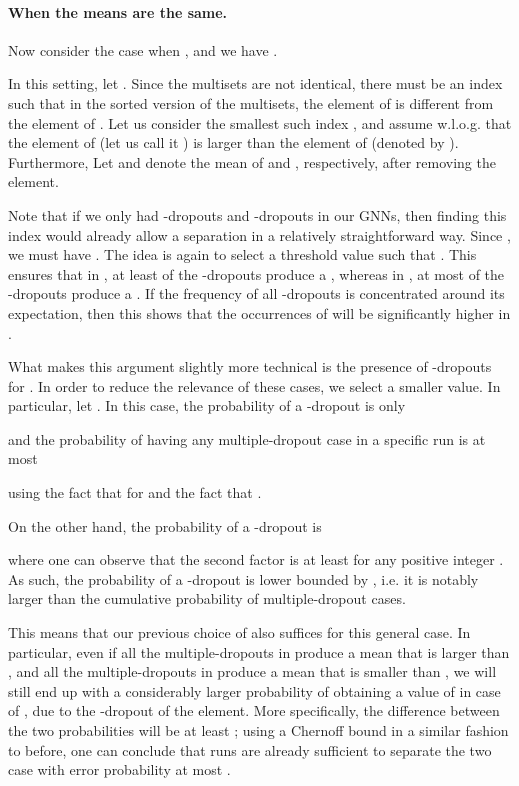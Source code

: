 \documentclass{article}
\begin{document}
\paragraph{When the means are the same.}

Now consider the case when , and we have .

In this setting, let . Since the multisets are not identical, there must be an index  such that in the sorted version of the multisets, the  element of  is different from the  element of . Let us consider the smallest such index , and assume w.l.o.g. that the  element of  (let us call it ) is larger than the  element of  (denoted by ). Furthermore, Let  and  denote the mean of  and , respectively, after removing the  element.

Note that if we only had -dropouts and -dropouts in our GNNs, then finding this index  would already allow a separation in a relatively straightforward way. Since , we must have . The idea is again to select a threshold value  such that . This ensures that in , at least  of the -dropouts produce a , whereas in , at most  of the -dropouts produce a . If the frequency of all -dropouts is concentrated around its expectation, then this shows that the occurrences of  will be significantly higher in .

What makes this argument slightly more technical is the presence of -dropouts for . In order to reduce the relevance of these cases, we select a smaller  value. In particular, let . In this case, the probability of a -dropout is only

and the probability of having any multiple-dropout case in a specific run is at most

using the fact that  for  and the fact that .

On the other hand, the probability of a -dropout is

where one can observe that the second factor is at least  for any positive integer . As such, the probability of a -dropout is lower bounded by , i.e. it is notably larger than the cumulative probability of multiple-dropout cases.

This means that our previous choice of  also suffices for this general case. In particular, even if all the multiple-dropouts in  produce a mean that is larger than , and all the multiple-dropouts in  produce a mean that is smaller than , we will still end up with a considerably larger probability of obtaining a value of  in case of , due to the -dropout of the  element. More specifically, the difference between the two probabilities will be at least ; using a Chernoff bound in a similar fashion to before, one can conclude that  runs are already sufficient to separate the two case with error probability at most .
\end{document}
